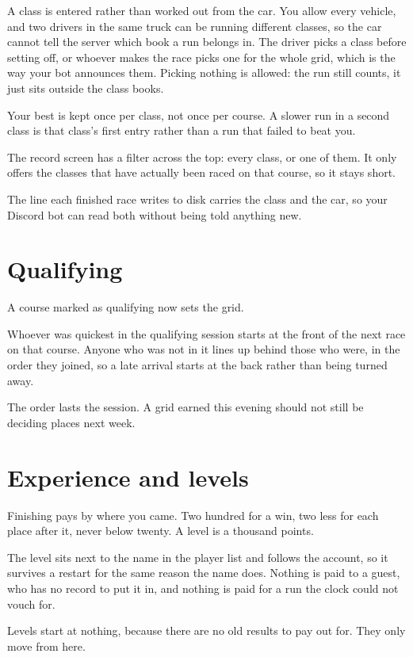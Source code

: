 \documentclass[11pt,a4paper]{article}
\begin{document}
A class is entered rather than worked out from the car. You allow every
vehicle, and two drivers in the same truck can be running different classes,
so the car cannot tell the server which book a run belongs in. The driver
picks a class before setting off, or whoever makes the race picks one for the
whole grid, which is the way your bot announces them. Picking nothing is
allowed: the run still counts, it just sits outside the class books.

Your best is kept once per class, not once per course. A slower run in a
second class is that class's first entry rather than a run that failed to beat
you.

The record screen has a filter across the top: every class, or one of them.
It only offers the classes that have actually been raced on that course, so
it stays short.

The line each finished race writes to disk carries the class and the car, so
your Discord bot can read both without being told anything new.

\section{Qualifying}

A course marked as qualifying now sets the grid.

Whoever was quickest in the qualifying session starts at the front of the next
race on that course. Anyone who was not in it lines up behind those who were,
in the order they joined, so a late arrival starts at the back rather than
being turned away.

The order lasts the session. A grid earned this evening should not still be
deciding places next week.

\section{Experience and levels}

Finishing pays by where you came. Two hundred for a win, two less for each
place after it, never below twenty. A level is a thousand points.

The level sits next to the name in the player list and follows the account,
so it survives a restart for the same reason the name does. Nothing is paid to
a guest, who has no record to put it in, and nothing is paid for a run the
clock could not vouch for.

Levels start at nothing, because there are no old results to pay out for.
They only move from here.
\end{document}
